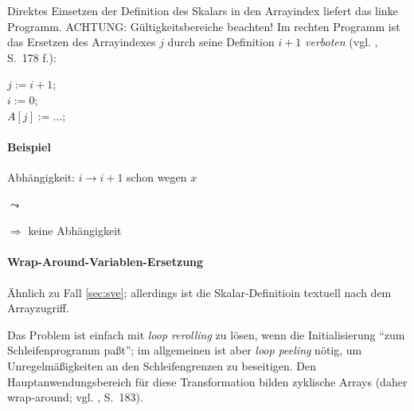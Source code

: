 Direktes Einsetzen der Definition des Skalars in den Arrayindex liefert
das linke Programm. ACHTUNG: Gültigkeitsbereiche beachten! Im rechten
Programm ist das Ersetzen des Arrayindexes $j$ durch seine Definition
$i+1$ \emph{verboten} (vgl. \cite{Zima90}, S.~178 f.):\\[1cm]
\begin{minipage}{.4\textwidth}
    \begin{algorithm}[H]
    \end{algorithm}    
\end{minipage}
\begin{minipage}{.4\textwidth}
    \begin{algorithm}[H]
    $j := i+1$;\\
    $i := 0$;\\
    $A[j] := ...$;\\
    \end{algorithm}    
\end{minipage}

\paragraph{Beispiel}

\begin{procedure}[H]
\SetAlgoLined
{}
\end{procedure}
Abhängigkeit: $i \rightarrow i+1$ schon wegen $x$

$\leadsto$

\begin{procedure}[H]
\SetAlgoLined
{}
\end{procedure}

$\Rightarrow$ keine Abhängigkeit
\newpage
\paragraph{Wrap-Around-Variablen-Ersetzung}
\label{sec:wave}

Ähnlich zu Fall \ref{sec:sve}; allerdings ist die Skalar-Definitioin
textuell nach dem Arrayzugriff. 

Das Problem ist einfach mit \emph{loop rerolling} zu lösen, wenn die
Initialisierung ``zum Schleifenprogramm paßt''; im allgemeinen ist aber
\emph{loop peeling} nötig, um Unregelmäßigkeiten an den Schleifengrenzen
zu beseitigen. Den Hauptanwendungsbereich für diese Transformation
bilden zyklische Arrays (daher wrap-around; vgl. \cite{Zima90}, S.~183).

